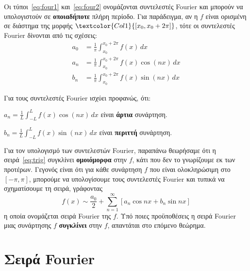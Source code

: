 \documentclass[a4paper,table]{report}
\begin{document}
      \begin{rem}
        Οι τύποι~\eqref{eq:four1} και~\eqref{eq:four2} ονομάζονται 
        \textcolor{Col1}{συντελεστές Fourier} και μπορούν να υπολογιστούν σε 
        \textbf{οποιαδήποτε} πλήρη περίοδο.  Για παράδειγμα, αν η $f$ είναι ορισμένη σε 
        διάστημα της μορφής $\textcolor{Col1}{[x_{0}, x_{0}+2 \pi]} $, τότε οι συντελεστές 
        Fourier δίνονται από τις σχέσεις:
        \begin{align*}
          a_{0} &= \frac{1}{\pi} \int _{x_{0}}^{x_{0}+ 2 \pi }f(x) \,{dx} \\
          a_{n} &= \frac{1}{\pi} \int _{x_{0}}^{x_{0}+ 2 \pi } f(x) \cos{(nx)} \,{dx}  \\
          b_{n} &= \frac{1}{\pi} \int _{x_{0}}^{x_{0}+ 2 \pi } f(x) \sin{(nx)} \,{dx}  
        \end{align*} 
      \end{rem}

      \begin{rem}
        Για τους συντελεστές Fourier ισχύει προφανώς, ότι:
        \begin{myitemize}
          \item $ a_{n} = \frac{1}{L} \int _{-L}^{L} f(x) \cos{(nx)} \,{dx} $ είναι
            \textbf{άρτια} συνάρτηση.
          \item $ b_{n} = \frac{1}{L} \int _{-L}^{L} f(x) \sin{(nx)} \,{dx} $ είναι
            \textbf{περιττή} συνάρτηση.
        \end{myitemize}
      \end{rem}

      \begin{rem}
        Για τον υπολογισμό των συντελεστών Fourier, παραπάνω θεωρήσαμε ότι η 
        σειρά~\eqref{eq:trig} συγκλίνει \textbf{ομοιόμορφα} στην $f$, κάτι που δεν το 
        γνωρίζουμε εκ των προτέρων.  Γεγονός είναι ότι για κάθε συνάρτηση $f$ που είναι 
        ολοκληρώσιμη στο $ [- \pi , \pi] $, μπορούμε να υπολογίσουμε τους συντελεστές 
        Fourier και τυπικά να σχηματίσουμε τη σειρά, γράφοντας
        \[
          f(x) \sim \frac{a_{0}}{2} + \sum_{n=1}^{\infty} [a_{n} \cos{nx} + b_{n} \sin{nx}]
        \] 
        η οποία ονομάζεται σειρά \textcolor{Col1}{Fourier} της $f$. Υπό ποιες προϋποθέσεις η 
        σειρά Fourier μιας συνάρτησης $f$ \textbf{συγκλίνει} στην $f$, απαντάται στο επόμενο 
        θεώρημα.
      \end{rem}



      \section{Σειρά Fourier}
\end{document}

